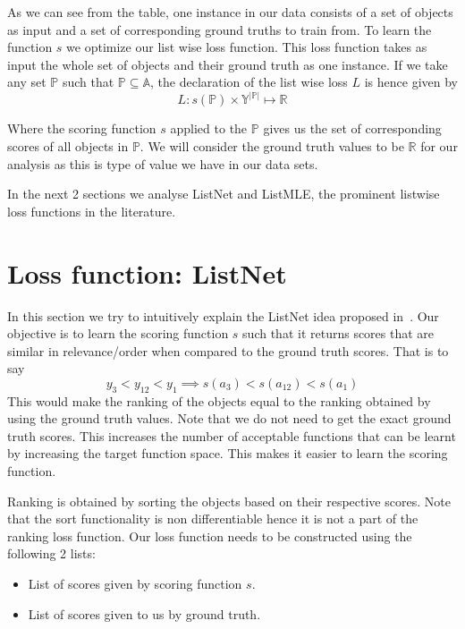 \documentclass[12pt, twoside, ngerman]{report}
\begin{document}
As we can see from the table,  one instance in our data consists of a set of objects as input and a set of corresponding ground truths to train from.
To learn the function $s$ we optimize our list wise loss function.
This loss function takes as input the whole set of objects and their ground truth as one instance.
If we take any set $\mathbb{P}$ such that $\mathbb{P} \subseteq \mathbb{A}$,  the declaration of the list wise loss $L$ is hence given by
\begin{equation}
L : s(\mathbb{P}) \times \mathbb{Y}^{|\mathbb{P}|} \mapsto \mathbb{R}
\end{equation}

Where the scoring function $s$ applied to the $\mathbb{P}$ gives us the set of corresponding scores of all objects in $\mathbb{P}$.
We will consider the ground truth values to be $\mathbb{R}$ for our analysis as this is type of value
we have in our data sets.

In the next 2 sections we analyse ListNet and ListMLE,  the prominent listwise loss functions in the literature.

\section{Loss function: ListNet}

In this section we try to intuitively explain the ListNet idea proposed in~\cite{listwisebetter}.
Our objective is to learn the scoring function $s$ such that it returns scores that are similar in relevance/order when compared to the ground truth scores.
That is to say
$$
y_3 < y_{12} < y_1 \implies s(a_3) < s(a_{12}) < s(a_1)
$$
This would make the ranking of the objects equal to the ranking obtained by using the ground truth values.
Note that we do not need to get the exact ground truth scores.
This increases the number of acceptable functions that can be learnt by increasing the target function space.
This makes it easier to learn the scoring function.

Ranking is obtained by sorting the objects based on their respective scores.
Note that the sort functionality is non differentiable hence it is not a 
part of the ranking loss function.
Our loss function needs to be constructed using the following 2 lists:
\begin{itemize}
\item List of scores given by scoring function $s$.
\item List of scores given to us by ground truth.
\end{itemize}
\end{document}
